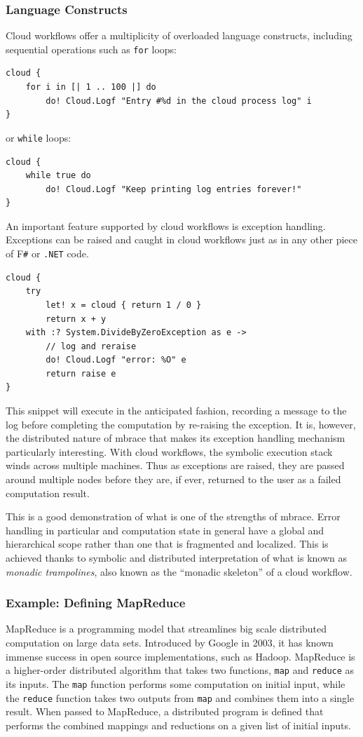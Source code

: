 \documentclass[9pt,a4paper]{article}
\newcommand{\mbrace}{mbrace}
\newcommand{\fsharp}{F\texttt \#}
\newcommand{\dotnet}{\texttt{\hbox{.}NET}}
\begin{document}
\subsubsection*{Language Constructs}
%
Cloud workflows offer a multiplicity of overloaded language constructs,
including sequential operations such as \texttt{for} loops:
\begin{lstlisting}
cloud {
    for i in [| 1 .. 100 |] do
        do! Cloud.Logf "Entry #%d in the cloud process log" i
}
\end{lstlisting}
or \texttt{while} loops:
\begin{lstlisting}
cloud {
    while true do
        do! Cloud.Logf "Keep printing log entries forever!"
}
\end{lstlisting}
%
An important feature supported by cloud workflows is exception handling. 
Exceptions can be raised and caught in cloud workflows just as in any other piece 
of \fsharp{} or \dotnet{} code. 
\begin{lstlisting}
cloud {
    try
        let! x = cloud { return 1 / 0 }
        return x + y
    with :? System.DivideByZeroException as e ->
        // log and reraise
        do! Cloud.Logf "error: %O" e
        return raise e
}
\end{lstlisting}
This snippet will execute in the anticipated fashion, recording a message to the log
before completing the computation by re-raising the exception.
It is, however, the distributed nature of \mbrace{} that makes its exception 
handling mechanism particularly interesting. With cloud workflows, the symbolic execution
stack winds across multiple machines. Thus as exceptions are raised, they are passed
around multiple nodes before they are, if ever, returned to the user as a failed
computation result.

This is a good demonstration of what is one of the strengths of \mbrace.
Error handling in particular and computation state in general have a global and hierarchical
scope rather than one that is fragmented and localized.
This is achieved thanks to symbolic and distributed interpretation of what is known as
\emph{monadic trampolines}\cite{data-types-ala-carte, scala-trampolines}, 
also known as the ``monadic skeleton'' of a cloud workflow.


\subsubsection*{Example: Defining MapReduce}

MapReduce is a programming model that streamlines big scale distributed computation
on large data sets. Introduced by Google in 2003, it has known immense success in open
source implementations, such as Hadoop. MapReduce is a higher-order distributed algorithm
that takes two functions, \texttt{map} and \texttt{reduce} as its inputs. The \texttt{map}
function performs some computation on initial input, while the \texttt{reduce} function
takes two outputs from \texttt{map} and combines them into a single result. 
When passed to MapReduce, a distributed program is defined that performs the combined 
mappings and reductions on a given list of initial inputs.
\end{document}
